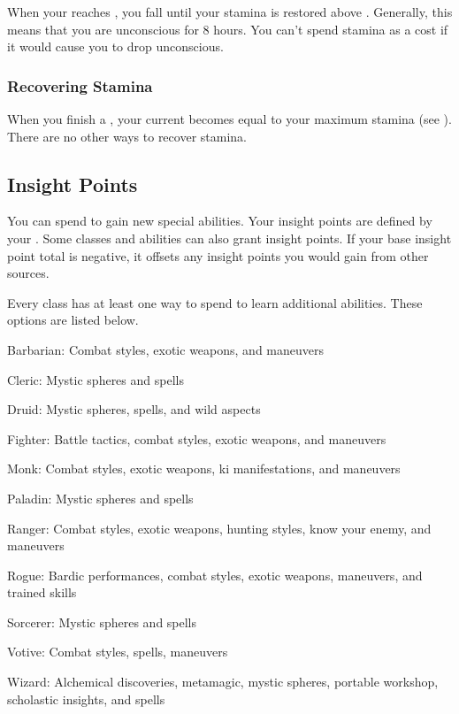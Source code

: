       When your  reaches , you fall \unconscious until your stamina is restored above .
      Generally, this means that you are unconscious for 8 hours.
      You can't spend stamina as a cost if it would cause you to drop unconscious.

    \subsubsection{Recovering Stamina}
      When you finish a , your current  becomes equal to your maximum stamina (see ).
      There are no other ways to recover stamina.

  \subsection{Insight Points}\label{Insight Points}
    You can spend  to gain new special abilities.
    Your insight points are defined by your .
    Some classes and abilities can also grant insight points.
    If your base insight point total is negative, it offsets any insight points you would gain from other sources.

    Every class has at least one way to spend  to learn additional abilities.
    These options are listed below.
    \begin{raggeditemize}
      \item Barbarian: Combat styles, exotic weapons, and maneuvers
      \item Cleric: Mystic spheres and spells
      \item Druid: Mystic spheres, spells, and wild aspects
      \item Fighter: Battle tactics, combat styles, exotic weapons, and maneuvers
      \item Monk: Combat styles, exotic weapons, ki manifestations, and maneuvers
      \item Paladin: Mystic spheres and spells
      \item Ranger: Combat styles, exotic weapons, hunting styles, know your enemy, and maneuvers
      \item Rogue: Bardic performances, combat styles, exotic weapons, maneuvers, and trained skills
      \item Sorcerer: Mystic spheres and spells
      \item Votive: Combat styles, spells, maneuvers
      \item Wizard: Alchemical discoveries, metamagic, mystic spheres, portable workshop, scholastic insights, and spells
    \end{raggeditemize}

